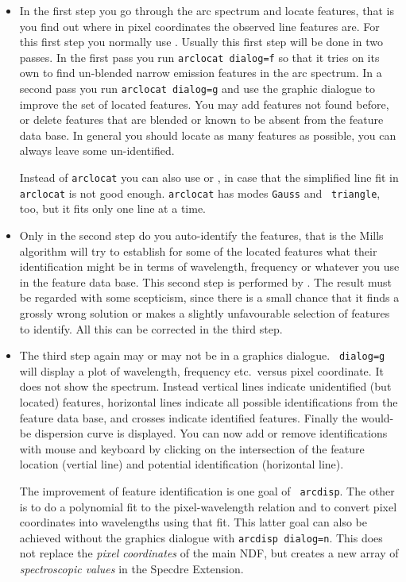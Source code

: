 \begin{itemize}
\item In the first step you go through the arc spectrum and locate
   features, that is you find out where in pixel coordinates the
   observed line features are.  For this first step you normally use
{\tt{}}.
   Usually this first step will be done in two passes. In the first pass
   you run {\tt arclocat dialog=f} so that it tries on its own to find
   un-blended narrow emission features in the arc spectrum.  In a second
   pass you run {\tt arclocat dialog=g} and use the graphic dialogue to
   improve the set of located features.  You may add features not found
   before, or delete features that are blended or known to be absent
   from the feature data base.  In general you should locate as many
   features as possible, you can always leave some un-identified.

   Instead of {\tt arclocat} you can also use
{\tt{}}
   or
{\tt{}},
   in case that the simplified line fit in {\tt arclocat} is
   not good enough.  {\tt arclocat} has modes {\tt Gauss} and {\tt
   triangle}, too, but it fits only one line at a time.

\item Only in the second step do you auto-identify the features, that is
   the Mills algorithm will try to establish for some of the located
   features what their identification might be in terms of wavelength,
   frequency or whatever you use in the feature data base.  This second
   step is performed by
{\tt{}}.
   The result must be regarded with some scepticism, since there is a
   small chance that it finds a grossly wrong solution or makes a
   slightly unfavourable selection of features to identify.  All this
   can be corrected in the third step.

\item The third step again may or may not be in a graphics dialogue.
{\tt{} dialog=g} will display a plot of
   wavelength, frequency etc.\ versus pixel coordinate.  It does not
   show the spectrum. Instead vertical lines indicate unidentified (but
   located) features, horizontal lines indicate all possible
   identifications from the feature data base, and crosses indicate
   identified features. Finally the would-be dispersion curve is
   displayed.  You can now add or remove identifications with mouse and
   keyboard by clicking on the intersection of the feature location
   (vertial line) and potential identification (horizontal line).

   The improvement of feature identification is one goal of {\tt
   arcdisp}.  The other is to do a polynomial fit to the
   pixel-wavelength relation and to convert pixel coordinates into
   wavelengths using that fit.  This latter goal can also be achieved
   without the graphics dialogue with {\tt arcdisp dialog=n}.  This does
   not replace the {\it pixel coordinates} of the main NDF, but creates
   a new array of {\it spectroscopic values} in the Specdre Extension.
\end{itemize}

